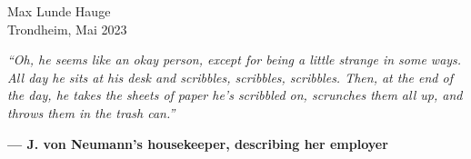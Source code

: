 \vspace*{1cm}

\begin{flushright}
    Max Lunde Hauge\\
    Trondheim, Mai 2023
\end{flushright}

\clearpage

\thispagestyle{empty} %

\vspace*{\fill}
\begin{center}
    \textit{\enquote{Oh, he seems like an okay person, except for being a little strange in some ways. All day he sits at his desk and scribbles, scribbles, scribbles. Then, at the end of the day, he takes the sheets of paper he's scribbled on, scrunches them all up, and throws them in the trash can.}}\\
\end{center}
\begin{flushright}
    \textbf{— J. von Neumann's housekeeper, describing her employer}
\end{flushright}
\vspace*{\fill}

\restoregeometry %





